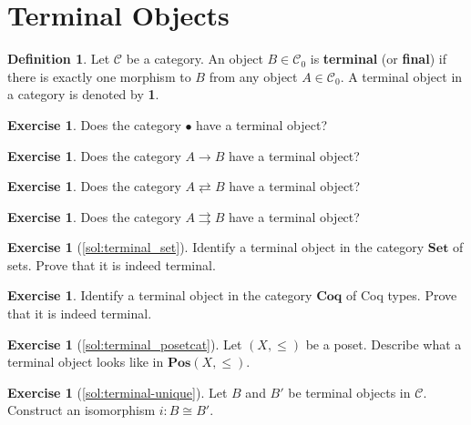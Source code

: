 \documentclass[a4paper,11pt, oneside,titlepage=false]{scrbook}
\theoremstyle{plain}
\theoremstyle{definition}
\newtheorem{dfn}[thm]{Definition}
\newtheorem{exer}[thm]{Exercise}
\newcommand{\Cat}[1]{\mathcal{#1}}
\newcommand{\CC}{\Cat{C}}
\newcommand{\Catb}[1]{\mathbf{#1}}
\newcommand{\SET}{\Catb{Set}}
\newcommand{\POS}{\Catb{Pos}}
\newcommand{\COQ}{\Catb{Coq}}
\newcommand{\Ob}[1]{{#1}_0}
\begin{document}
\section{Terminal Objects}
\label{sec:terminal-objects}



\begin{dfn}
  Let $\CC$ be a category. An object $B \in \Ob{\CC}$ is \textbf{terminal} (or \textbf{final}) if there is exactly one morphism to $B$ from any object $A \in \Ob{\CC}$.
  A terminal object in a category is denoted by \textbf{1}.
\end{dfn}

\begin{exer}
  Does the category $\bullet$ have a terminal object?
\end{exer}

\begin{exer}
  Does the category $A \to B$ have a terminal object?
\end{exer}

\begin{exer}
  Does the category $A \rightleftarrows B$ have a terminal object?
\end{exer}

\begin{exer}
  Does the category $A \rightrightarrows B$ have a terminal object?
\end{exer}



\begin{exer}[\cref{sol:terminal_set}]\label{exer:terminal_set}
  Identify a terminal object in the category $\SET$ of sets.
  Prove that it is indeed terminal.
\end{exer}

\begin{exer}
  Identify a terminal object in the category $\COQ$ of Coq types.
  Prove that it is indeed terminal.
\end{exer}

\begin{exer}[\cref{sol:terminal_posetcat}]\label{exer:terminal_posetcat}
  Let $(X,\leq)$ be a poset. Describe what a terminal object looks like in  $\POS(X,\leq)$.
\end{exer}

\begin{exer}[\cref{sol:terminal-unique}]\label{exer:terminal-unique}
  Let $B$ and $B'$ be terminal objects in $\CC$. Construct an isomorphism $i : B \cong B'$.
\end{exer}
\end{document}
